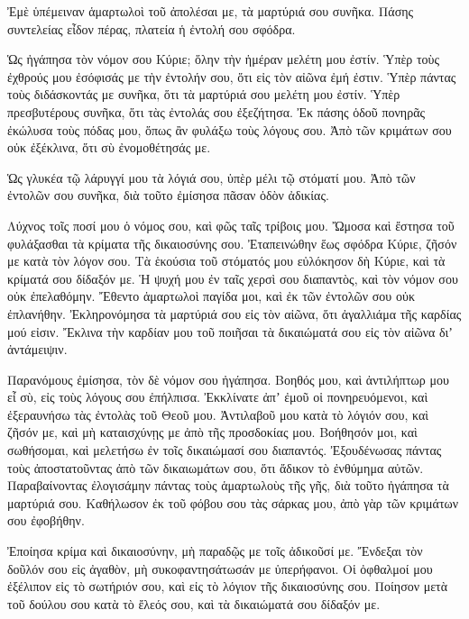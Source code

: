 {Ἐμὲ ὑπέμειναν ἁμαρτωλοὶ τοῦ ἀπολέσαι με, τὰ μαρτύριά σου συνῆκα.
Πάσης συντελείας εἶδον πέρας, πλατεία ἡ ἐντολή σου σφόδρα.
\par }{\PP {}Ὡς ἠγάπησα τὸν νόμον σου Κύριε; ὅλην τὴν ἡμέραν μελέτη μου ἐστίν.
Ὑπὲρ τοὺς ἐχθρούς μου ἐσόφισάς με τὴν ἐντολήν σου, ὅτι εἰς τὸν αἰῶνα ἐμή ἐστιν.
Ὑπὲρ πάντας τοὺς διδάσκοντάς με συνῆκα, ὅτι τὰ μαρτύριά σου μελέτη μου ἐστίν.
Ὑπὲρ πρεσβυτέρους συνῆκα, ὅτι τὰς ἐντολάς σου ἐξεζήτησα.
Ἐκ πάσης ὁδοῦ πονηρᾶς ἐκώλυσα τοὺς πόδας μου, ὅπως ἂν φυλάξω τοὺς λόγους σου.
Ἀπὸ τῶν κριμάτων σου οὐκ ἐξέκλινα, ὅτι σὺ ἐνομοθέτησάς με.
\par }{\PP {}Ὡς γλυκέα τῷ λάρυγγί μου τὰ λόγιά σου, ὑπὲρ μέλι τῷ στόματί μου.
Ἀπὸ τῶν ἐντολῶν σου συνῆκα, διὰ τοῦτο ἐμίσησα πᾶσαν ὁδὸν ἀδικίας.
\par }{\PP {}Λύχνος τοῖς ποσί μου ὁ νόμος σου, καὶ φῶς ταῖς τρίβοις μου.
Ὤμοσα καὶ ἔστησα τοῦ φυλάξασθαι τὰ κρίματα τῆς δικαιοσύνης σου.
Ἐταπεινώθην ἕως σφόδρα Κύριε, ζῆσόν με κατὰ τὸν λόγον σου.
Τὰ ἑκούσια τοῦ στόματός μου εὐλόκησον δὴ Κύριε, καὶ τὰ κρίματά σου δίδαξόν με.
Ἡ ψυχή μου ἐν ταῖς χερσὶ σου διαπαντὸς, καὶ τὸν νόμον σου οὐκ ἐπελαθόμην.
Ἔθεντο ἁμαρτωλοὶ παγίδα μοι, καὶ ἐκ τῶν ἐντολῶν σου οὐκ ἐπλανήθην.
Ἐκληρονόμησα τὰ μαρτύριά σου εἰς τὸν αἰῶνα, ὅτι ἀγαλλιάμα τῆς καρδίας μού εἰσιν.
Ἔκλινα τὴν καρδίαν μου τοῦ ποιῆσαι τὰ δικαιώματά σου εἰς τὸν αἰῶνα διʼ ἀντάμειψιν.
\par }{\PP {}Παρανόμους ἐμίσησα, τὸν δὲ νόμον σου ἠγάπησα.
Βοηθός μου, καὶ ἀντιλήπτωρ μου εἶ σὺ, εἰς τοὺς λόγους σου ἐπήλπισα.
Ἐκκλίνατε ἀπʼ ἐμοῦ οἱ πονηρευόμενοι, καὶ ἐξεραυνήσω τὰς ἐντολὰς τοῦ Θεοῦ μου.
Ἀντιλαβοῦ μου κατὰ τὸ λόγιόν σου, καὶ ζῆσόν με, καὶ μὴ καταισχύνῃς με ἀπὸ τῆς προσδοκίας μου.
Βοήθησόν μοι, καὶ σωθήσομαι, καὶ μελετήσω ἐν τοῖς δικαιώμασί σου διαπαντός.
Ἐξουδένωσας πάντας τοὺς ἀποστατοῦντας ἀπὸ τῶν δικαιωμάτων σου, ὅτι ἄδικον τὸ ἐνθύμημα αὐτῶν.
Παραβαίνοντας ἐλογισάμην πάντας τοὺς ἁμαρτωλοὺς τῆς γῆς, διὰ τοῦτο ἠγάπησα τὰ μαρτύριά σου.
Καθήλωσον ἐκ τοῦ φόβου σου τὰς σάρκας μου, ἀπὸ γὰρ τῶν κριμάτων σου ἐφοβήθην.
\par }{\PP {}Ἐποίησα κρίμα καὶ δικαιοσύνην, μὴ παραδῷς με τοῖς ἀδικοῦσί με.
Ἔνδεξαι τὸν δοῦλόν σου εἰς ἀγαθὸν, μὴ συκοφαντησάτωσάν με ὑπερήφανοι.
Οἱ ὀφθαλμοί μου ἐξέλιπον εἰς τὸ σωτήριόν σου, καὶ εἰς τὸ λόγιον τῆς δικαιοσύνης σου.
Ποίησον μετὰ τοῦ δούλου σου κατὰ τὸ ἔλεός σου, καὶ τὰ δικαιώματά σου δίδαξόν με.
}
